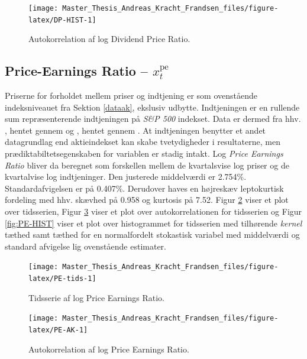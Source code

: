 \documentclass[
  a4paper,
  oneside]{memoir}
\begin{document}
\begin{figure}[htbp!]

{\centering \texttt{[image: Master\_Thesis\_Andreas\_Kracht\_Frandsen\_files/figure-latex/DP-HIST-1]} 

}

\caption{Autokorrelation af log Dividend Price Ratio.}\label{fig:DP-HIST}
\end{figure}

\hypertarget{price-earnings-ratio-x_ttextpe}{%
\subsection{\texorpdfstring{Price-Earnings Ratio -- \(x_t^{\text{pe}}\)}{Price-Earnings Ratio -- x\_t\^{}\{\textbackslash text\{pe\}\}}}\label{price-earnings-ratio-x_ttextpe}}

Priserne for forholdet mellem priser og indtjening er som ovenstående indeksniveauet fra Sektion \ref{dataak}, ekslusiv udbytte. Indtjeningen er en rullende sum repræsenterende indtjeningen på \emph{S\&P 500} indekset. Data er dermed fra hhv. \citep{CRSPakt}, hentet gennem \citep{WRDSakt} og \citep{Shiller2020}, hentet gennem \citep{Goyal2007}. At indtjeningen benytter et andet datagrundlag end aktieindekset kan skabe tvetydigheder i resultaterne, men prædiktabiltetsegenskaben for variablen er stadig intakt. Log \emph{Price Earnings Ratio} bliver da beregnet som forskellen mellem de kvartalsvise log priser og de kvartalvise log indtjeninger. Den justerede middelværdi er 2.754\(\%\). Standardafvigelsen er på 0.407\(\%\). Derudover haves en højreskæv leptokurtisk fordeling med hhv. skævhed på 0.958 og kurtosis på 7.52. Figur \ref{fig:PE-tids} viser et plot over tidsserien, Figur \ref{fig:PE-AK} viser et plot over autokorrelationen for tidsserien og Figur \ref{fig:PE-HIST} viser et plot over histogrammet for tidsserien med tilhørende \emph{kernel} tæthed samt tæthed for en normalfordelt stokastisk variabel med middelværdi og standard afvigelse lig ovenstående estimater.

\begin{figure}[htbp!]

{\centering \texttt{[image: Master\_Thesis\_Andreas\_Kracht\_Frandsen\_files/figure-latex/PE-tids-1]} 

}

\caption{Tidsserie af log Price Earnings Ratio.}\label{fig:PE-tids}
\end{figure}

\begin{figure}[htbp!]

{\centering \texttt{[image: Master\_Thesis\_Andreas\_Kracht\_Frandsen\_files/figure-latex/PE-AK-1]} 

}

\caption{Autokorrelation af log Price Earnings Ratio.}\label{fig:PE-AK}
\end{figure}
\end{document}

